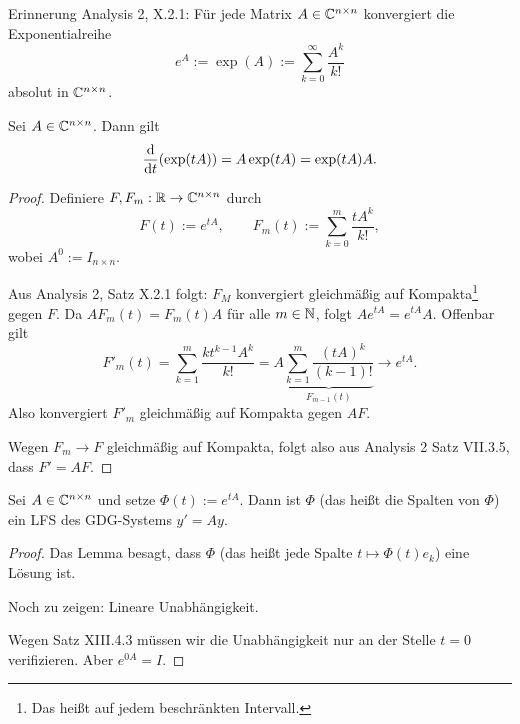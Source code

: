 Erinnerung Analysis 2, X.2.1: Für jede Matrix $A \in \mathbb{C}^{n \times n}$
konvergiert die Exponentialreihe
\[ e^A := \exp(A) := \sum_{k=0}^\infty \frac{A^k}{k!} \]
absolut in $\mathbb{C}^{n \times n}$.

\begin{lem}
  Sei $A \in \mathbb{C}^{n \times n}$. Dann gilt
  \[ \frac{\mathrm{d} }{\mathrm{d} t} (\exp(tA)) = A \exp(tA) = \exp(tA)A. \]
\end{lem}

\begin{proof}
  Definiere $F,F_m:\mathbb{R} \to \mathbb{C}^{n \times n}$ durch
  \[ F(t) := e^{tA}, \qquad F_m(t) := \sum_{k=0}^m \frac{tA^k}{k!}, \]
  wobei $A^0 := I_{n \times n}$.
  
  Aus Analysis 2, Satz X.2.1 folgt: $F_M$ konvergiert gleichmäßig auf
  Kompakta\footnote{%
    Das heißt auf jedem beschränkten Intervall.
  }
  gegen $F$. Da $AF_m(t) = F_m(t) A$ für alle $m \in \mathbb{N}$, folgt $A e^{tA} =
  e^{tA} A$. Offenbar gilt
  \[ F'_m(t) = \sum_{k=1}^m \frac{kt^{k-1}A^k}{k!} = A \underbrace{\sum_{k=1}^m
      \frac{(tA)^k}{(k-1)!}}_{F_{m-1}(t)} \to e^{tA}. \]
  Also konvergiert $F'_m$ gleichmäßig auf Kompakta gegen $AF$.

  Wegen $F_m \to F$ gleichmäßig auf Kompakta, folgt also aus Analysis 2 Satz
  VII.3.5, dass $F' = AF$.
\end{proof}

\begin{thm}
  Sei $A \in \mathbb{C}^{n \times n}$ und setze $\Phi(t) := e^{tA}$. Dann ist
  $\Phi$ (das heißt die Spalten von $\Phi$) ein LFS des GDG-Systems $y' = Ay$.
\end{thm}

\begin{proof}
  Das Lemma besagt, dass $\Phi$ (das heißt jede Spalte $t \mapsto \Phi(t) e_k$)
  eine Lösung ist.

  Noch zu zeigen: Lineare Unabhängigkeit.

  Wegen Satz XIII.4.3 müssen wir die Unabhängigkeit nur an der Stelle $t=0$
  verifizieren. Aber $e^{0A} = I$.
\end{proof}

